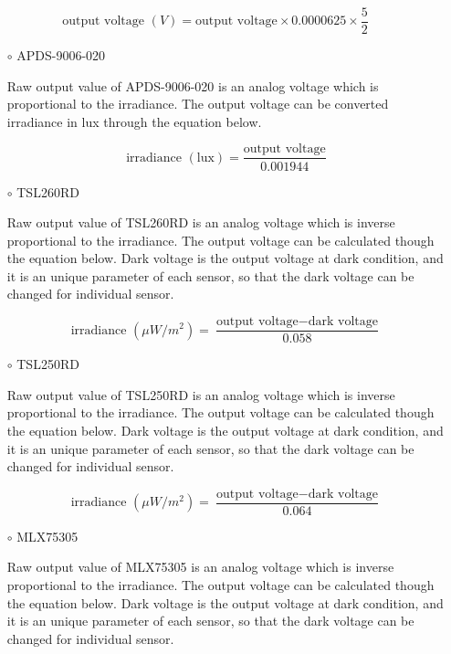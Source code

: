 \bigbreak

{\centering
 \[ \text{output voltage }(V) =  \text{output voltage} \times 0.0000625 \times \frac{5}{2} \]
 \par
 }

\begin{itemize}
\item[$\circ$] APDS-9006-020

Raw output value of APDS-9006-020 is an analog voltage which is proportional to the irradiance. The output voltage can be converted irradiance in lux through the equation below.

\bigbreak

{\centering
 \[ \text{irradiance } (\text{lux}) = \frac{\text{output voltage}}{0.001944} \]
 \par
 }

 
\item[$\circ$] TSL260RD

Raw output value of TSL260RD is an analog voltage which is inverse proportional to the irradiance. The output voltage can be calculated though the equation below.
Dark voltage is the output voltage at dark condition, and it is an unique parameter of each sensor, so that the dark voltage can be changed for individual sensor.

\bigbreak

{\centering
 \[ \text{irradiance } (\mu W/m^2) = \frac{\text{output voltage} - \text{dark voltage}}{0.058} \]
 \par
 }


\item[$\circ$] TSL250RD

Raw output value of TSL250RD is an analog voltage which is inverse proportional to the irradiance. The output voltage can be calculated though the equation below.
Dark voltage is the output voltage at dark condition, and it is an unique parameter of each sensor, so that the dark voltage can be changed for individual sensor.

\bigbreak

{\centering
 \[ \text{irradiance } (\mu W/m^2) = \frac{\text{output voltage} - \text{dark voltage}}{0.064} \]
 \par
 }
 

\item[$\circ$] MLX75305

Raw output value of MLX75305 is an analog voltage which is inverse proportional to the irradiance. The output voltage can be calculated though the equation below.
Dark voltage is the output voltage at dark condition, and it is an unique parameter of each sensor, so that the dark voltage can be changed for individual sensor.


\end{itemize}

